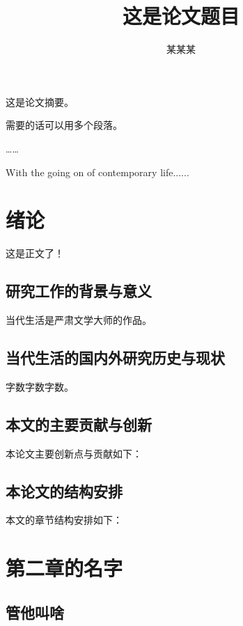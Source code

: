 \documentclass[bachelor,nofonts]{njupthesis}
\title{这是论文题目}
\author{某某某}
\begin{document}
\makecover

\begin{chineseabstract}
这是论文摘要。 

需要的话可以用多个段落。

……

\end{chineseabstract}

\begin{englishabstract}
With the going on of contemporary life......



\end{englishabstract}

\thesistableofcontents

\thesischapterexordium

\chapter{绪论}
这是正文了！

\section{研究工作的背景与意义}

当代生活是严肃文学大师的作品。


\section{当代生活的国内外研究历史与现状}
字数字数字数。

\section{本文的主要贡献与创新}
本论文主要创新点与贡献如下：

\section{本论文的结构安排}
本文的章节结构安排如下：


\chapter{第二章的名字}

\section{管他叫啥}
\end{document}
